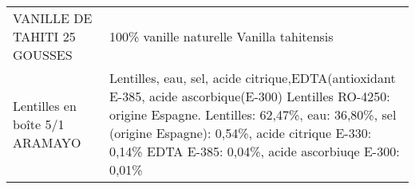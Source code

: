 \begin{longtable}{p{5cm}p{10cm}}
                                                                             VANILLE DE TAHITI 25 GOUSSES &                                                                                                                                                                                                                                                                                                                                                                                                                                                                                                                                                                                                                                                                                                                                                                                                                                                                                                                                                                                                100\% vanille naturelle Vanilla tahitensis \\
                                                                           Lentilles en boîte 5/1 ARAMAYO &                                                                                                                                                                                                                                                                                                                                                                                                                                                                                                                                                                                                                                                                                                                                                                      Lentilles, eau, sel, acide citrique,EDTA(antioxidant E-385, acide ascorbique(E-300)  Lentilles RO-4250: origine Espagne. Lentilles: 62,47\%, eau: 36,80\%, sel (origine Espagne): 0,54\%, acide citrique E-330: 0,14\% EDTA E-385: 0,04\%, acide ascorbiuqe E-300: 0,01\% \\

\end{longtable}

